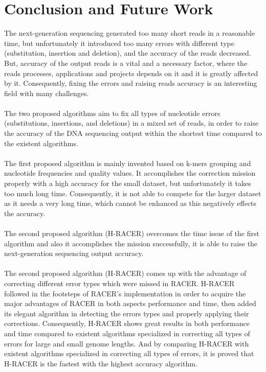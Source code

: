 \documentclass[12pt]{llncs}
\begin{document}
\chapter{\label{chap:7}Conclusion and Future Work}
The next-generation sequencing generated too many short reads in a reasonable time, but unfortunately it introduced too many errors with different type (substitution, insertion and deletion), and the accuracy of the reads decreased. But, accuracy of the output reads is a vital and a necessary factor, where the reads processes, applications and projects depends on it and  it is greatly affected by it. Consequently, fixing the errors and raising reads accuracy is an interesting field with many challenges.
\\
\\
The two proposed algorithms aim to fix all types of nucleotide errors (substitutions, insertions, and deletions) in a mixed set of reads, in order to raise the accuracy of the DNA sequencing output within the shortest time compared to the existent algorithms. 
\\
\\
The first proposed algorithm is mainly invented based on k-mers grouping and nucleotide frequencies and quality values. It accomplishes the correction mission properly with a high accuracy for the small dataset, but unfortunately it takes too much long time. Consequently, it is not able to compete for the larger dataset as it needs a very long time, which cannot be enhanced as this negatively effects the accuracy.
\\
\\
The second proposed algorithm (H-RACER) overcomes the time issue of the first algorithm and also it accomplishes the mission successfully, it is able to raise the next-generation sequencing output accuracy. 
\\
\\
The second proposed algorithm (H-RACER) comes up with the advantage of correcting different error types which were missed in RACER. H-RACER followed in the footsteps of RACER's implementation in order to acquire the major advantages of RACER in both aspects performance and time, then added its elegant algorithm in detecting the errors types and properly applying their corrections. Consequently, H-RACER shows great results in both performance and time compared to existent algorithms specialized in correcting all types of errors for large and small genome lengths. And by comparing H-RACER with existent algorithms specialized in correcting all types of errors, it is proved that H-RACER is the fastest with the highest accuracy algorithm.
\end{document}
